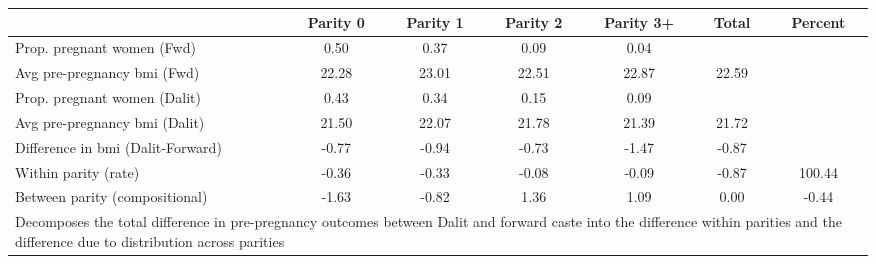 \begin{tabular}{l*{6}{c}}
\toprule
            &\multicolumn{1}{c}{Parity 0}&\multicolumn{1}{c}{Parity 1}&\multicolumn{1}{c}{Parity 2}&\multicolumn{1}{c}{Parity 3+}&\multicolumn{1}{c}{Total}&\multicolumn{1}{c}{Percent}\\
\midrule
\midrule
Prop. pregnant women (Fwd)&        0.50&        0.37&        0.09&        0.04&            &            \\
Avg pre-pregnancy bmi (Fwd)&       22.28&       23.01&       22.51&       22.87&       22.59&            \\
Prop. pregnant women (Dalit)&        0.43&        0.34&        0.15&        0.09&            &            \\
Avg pre-pregnancy bmi (Dalit)&       21.50&       22.07&       21.78&       21.39&       21.72&            \\
Difference in bmi (Dalit-Forward)&       -0.77&       -0.94&       -0.73&       -1.47&       -0.87&            \\
Within parity (rate)&       -0.36&       -0.33&       -0.08&       -0.09&       -0.87&      100.44\\
Between parity (compositional)&       -1.63&       -0.82&        1.36&        1.09&        0.00&       -0.44\\
\bottomrule
\multicolumn{7}{l}{\footnotesize Decomposes the total difference in pre-pregnancy outcomes between Dalit and forward caste into the difference within parities and the difference due to distribution across parities}\\
\end{tabular}
